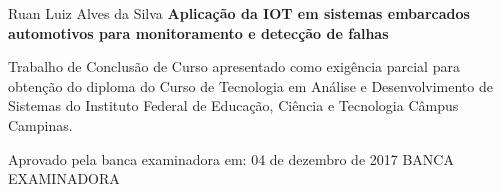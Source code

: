 \begin{folhadeaprovacao}
\linespread{1.5}

  \begin{center}
    {\chapterfont Ruan Luiz Alves da Silva}
    \vfill\vspace{2cm}
    {\chapterfont\bfseries Aplicação da IOT em sistemas embarcados automotivos para monitoramento e detecção de falhas}
    \vfill\vspace{1.5cm}
    \end{center}
    
    \hspace{.45\textwidth}
    \begin{minipage}{.47\linewidth}
	\vfill	
	Trabalho de Conclus\~{a}o de Curso apresentado como exig\^encia parcial para obten\c{c}\~{a}o do diploma do Curso de Tecnologia em An\'{a}lise e Desenvolvimento de Sistemas do Instituto Federal de Educa\c{c}\~{a}o, Ci\^{e}ncia e Tecnologia C\^{a}mpus Campinas.
    \end{minipage}
\vfill\vspace{1cm}  

\begin{center}
Aprovado pela banca examinadora em: 04 de dezembro de 2017
\vfill \vspace{1cm}
{\large BANCA EXAMINADORA}
\end{center}
\end{folhadeaprovacao}

